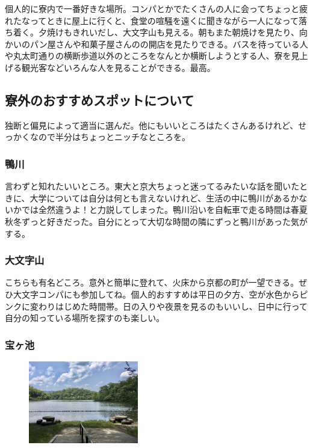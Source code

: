 個人的に寮内で一番好きな場所。コンパとかでたくさんの人に会ってちょっと疲れたなってときに屋上に行くと、食堂の喧騒を遠くに聞きながら一人になって落ち着く。夕焼けもきれいだし、大文字山も見える。朝もまた朝焼けを見たり、向かいのパン屋さんや和菓子屋さんのの開店を見たりできる。バスを待っている人や丸太町通りの横断歩道以外のところをなんとか横断しようとする人、寮を見上げる観光客などいろんな人を見ることができる。最高。%

\subsection{寮外のおすすめスポットについて}
独断と偏見によって適当に選んだ。他にもいいところはたくさんあるけれど、せっかくなので半分はちょっとニッチなところを。

\subsubsection{鴨川}
言わずと知れたいいところ。東大と京大ちょっと迷ってるみたいな話を聞いたときに、大学については自分は何とも言えないけれど、生活の中に鴨川があるかないかでは全然違うよ！と力説してしまった。鴨川沿いを自転車で走る時間は春夏秋冬ずっと好きだった。自分にとって大切な時間の隣にずっと鴨川があった気がする。

\subsubsection{大文字山}
こちらも有名どころ。意外と簡単に登れて、火床から京都の町が一望できる。ぜひ大文字コンパにも参加してね。個人的おすすめは平日の夕方、空が水色からピンクに変わりはじめた時間帯。日の入りや夜景を見るのもいいし、日中に行って自分の知っている場所を探すのも楽しい。

\subsubsection{宝ヶ池}
\begin{figure}
  \centering
  \includegraphics[width=4.8cm]{gazo/takaragaike.jpg}
\end{figure}

